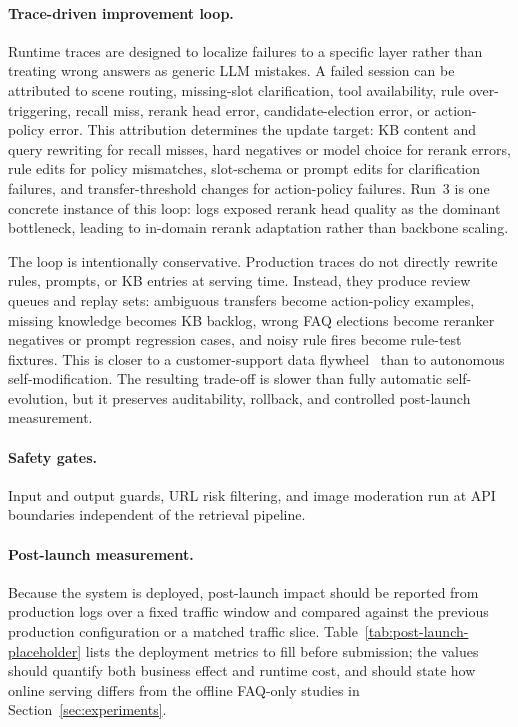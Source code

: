 \documentclass[sigconf,review]{acmart}
\begin{document}
\paragraph{Trace-driven improvement loop.}
Runtime traces are designed to localize failures to a specific layer rather than treating wrong answers as generic LLM mistakes. A failed session can be attributed to scene routing, missing-slot clarification, tool availability, rule over-triggering, recall miss, rerank head error, candidate-election error, or action-policy error. This attribution determines the update target: KB content and query rewriting for recall misses, hard negatives or model choice for rerank errors, rule edits for policy mismatches, slot-schema or prompt edits for clarification failures, and transfer-threshold changes for action-policy failures. Run~3 is one concrete instance of this loop: logs exposed rerank head quality as the dominant bottleneck, leading to in-domain rerank adaptation rather than backbone scaling.

The loop is intentionally conservative. Production traces do not directly rewrite rules, prompts, or KB entries at serving time. Instead, they produce review queues and replay sets: ambiguous transfers become action-policy examples, missing knowledge becomes KB backlog, wrong FAQ elections become reranker negatives or prompt regression cases, and noisy rule fires become rule-test fixtures. This is closer to a customer-support data flywheel~\cite{zhao2025agentloop} than to autonomous self-modification. The resulting trade-off is slower than fully automatic self-evolution, but it preserves auditability, rollback, and controlled post-launch measurement.

\paragraph{Safety gates.}
Input and output guards, URL risk filtering, and image moderation run at API boundaries independent of the retrieval pipeline.

\paragraph{Post-launch measurement.}
Because the system is deployed, post-launch impact should be reported from production logs over a fixed traffic window and compared against the previous production configuration or a matched traffic slice. Table~\ref{tab:post-launch-placeholder} lists the deployment metrics to fill before submission; the values should quantify both business effect and runtime cost, and should state how online serving differs from the offline FAQ-only studies in Section~\ref{sec:experiments}.
\end{document}
